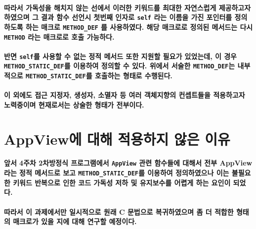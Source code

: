 \documentclass[UTF8]{report}
\begin{document}
            \paragraph{%
                \normalfont 따라서 가독성을 해치지 않는 선에서 이러한 키워드를 최대한 자연스럽게 제공하고자 하였으며 그 결과 함수 선언시 첫번째 인자로 \texttt{self} 라는 이름을 가진 포인터를 정의하도록 하는 매크로 \texttt{METHOD\_DEF} 를 사용하였다. 해당 매크로로 정의된 메서드는 다시 \texttt{METHOD} 라는 매크로로 호출 가능하다.
            }

            \paragraph{%
                \normalfont 반면 \texttt{self}를 사용할 수 없는 정적 메서드 또한 지원할 필요가 있었는데, 이 경우 \texttt{METHOD\_STATIC\_DEF}를 이용하여 정의할 수 있다. 위에서 서술한 \texttt{METHOD\_DEF}는 내부적으로 \texttt{METHOD\_STATIC\_DEF}를 호출하는 형태로 수행된다.
            }

            \paragraph{%
                \normalfont 이 외에도 접근 지정자, 생성자, 소멸자 등 여러 객체지향의 컨셉트들을 적용하고자 노력중이며 현재로서는 상술한 형태가 전부이다.
            }

        \section{AppView에 대해 적용하지 않은 이유}    
            \paragraph{%
                \normalfont 앞서 4주차 2차방정식 프로그램에서 \texttt{AppView} 관련 함수들에 대해서 전부 AppView라는 정적 메서드로 보고 \texttt{METHOD\_STATIC\_DEF}를 이용하여 정의하였으나 이는 불필요한 키워드 반복으로 인한 코드 가독성 저하 및 유지보수를 어렵게 하는 요인이 되었다.
            }

            \paragraph{%
                \normalfont 따라서 이 과제에서만 일시적으로 원래 C 문법으로 복귀하였으며 좀 더 적합한 형태의 매크로가 있을 지에 대해 연구할 예정이다.
            }
\end{document}
